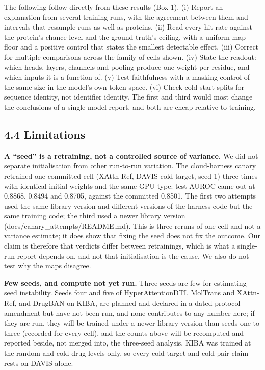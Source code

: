 \documentclass[
  11pt,
]{article}
\begin{document}
The following follow directly from these results (Box 1). (i) Report an explanation from several training runs, with the agreement between them and intervals that resample runs as well as proteins. (ii) Read every hit rate against the protein's chance level and the ground truth's ceiling, with a uniform-map floor and a positive control that states the smallest detectable effect. (iii) Correct for multiple comparisons across the family of cells shown. (iv) State the readout: which heads, layers, channels and pooling produce one weight per residue, and which inputs it is a function of. (v) Test faithfulness with a masking control of the same size in the model's own token space. (vi) Check cold-start splits for sequence identity, not identifier identity. The first and third would most change the conclusions of a single-model report, and both are cheap relative to training.

\subsection{4.4 Limitations}\label{limitations}

\textbf{A ``seed'' is a retraining, not a controlled source of variance.} We did not separate initialisation from other run-to-run variation. The cloud-harness canary retrained one committed cell (XAttn-Ref, DAVIS cold-target, seed 1) three times with identical initial weights and the same GPU type: test AUROC came out at 0.8868, 0.8494 and 0.8705, against the committed 0.8501. The first two attempts used the same library version and different versions of the harness code but the same training code; the third used a newer library version (docs/canary\_attempts/README.md). This is three reruns of one cell and not a variance estimate; it does show that fixing the seed does not fix the outcome. Our claim is therefore that verdicts differ between retrainings, which is what a single-run report depends on, and not that initialisation is the cause. We also do not test why the maps disagree.

\textbf{Few seeds, and compute not yet run.} Three seeds are few for estimating seed instability. Seeds four and five of HyperAttentionDTI, MolTrans and XAttn-Ref, and DrugBAN on KIBA, are planned and declared in a dated protocol amendment but have not been run, and none contributes to any number here; if they are run, they will be trained under a newer library version than seeds one to three (recorded for every cell), and the counts above will be recomputed and reported beside, not merged into, the three-seed analysis. KIBA was trained at the random and cold-drug levels only, so every cold-target and cold-pair claim rests on DAVIS alone.
\end{document}

